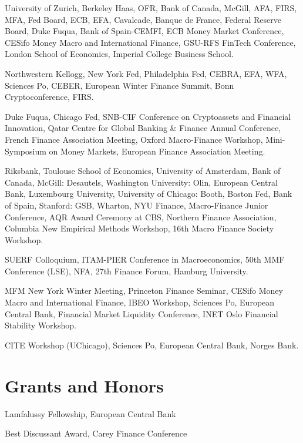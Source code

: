 \documentclass[11pt]{res} %
\begin{document}
\begin{resume}
 University of Zurich, Berkeley Haas, OFR, Bank of Canada, McGill, AFA, FIRS, MFA, Fed Board, ECB, EFA, Cavalcade, Banque de France, Federal Reserve Board, Duke Fuqua, Bank of Spain-CEMFI, ECB Money Market Conference, CESifo Money Macro and International Finance, GSU-RFS FinTech Conference, London School of Economics, Imperial College Business School.

 Northwestern Kellogg, New York Fed, Philadelphia Fed, CEBRA, EFA, WFA, Sciences Po, CEBER, European Winter Finance Summit, Bonn Cryptoconference, FIRS.

 Duke Fuqua, Chicago Fed, SNB-CIF Conference on Cryptoassets and Financial Innovation, Qatar Centre for Global Banking \& Finance Annual Conference, French Finance Association Meeting, Oxford Macro-Finance Workshop, Mini-Symposium on Money Markets, European Finance Association Meeting.

 Riksbank, Toulouse School of Economics, University of Amsterdam, Bank of Canada, McGill: Desautels, Washington University: Olin, European Central Bank, Luxembourg University, University of Chicago: Booth, Boston Fed, Bank of Spain, Stanford: GSB, Wharton, NYU Finance, Macro-Finance Junior Conference, AQR Award Ceremony at CBS, Northern Finance Association, Columbia New Empirical Methods Workshop, 16th Macro Finance Society Workshop.

 SUERF Colloquium, ITAM-PIER Conference in Macroeconomics, 50th MMF Conference (LSE), NFA, 27th Finance Forum, Hamburg University.

 MFM New York Winter Meeting, Princeton Finance Seminar, CESifo Money Macro and International Finance, IBEO Workshop, Sciences Po, European Central Bank, Financial Market Liquidity Conference, INET Oslo Financial Stability Workshop.

 CITE Workshop (UChicago), Sciences Po, European Central Bank, Norges Bank.

\section{Grants and Honors} 
\vspace{8pt}

 Lamfalussy Fellowship, European Central Bank

 Best Discussant Award, Carey Finance Conference


\end{resume}
\end{document}

